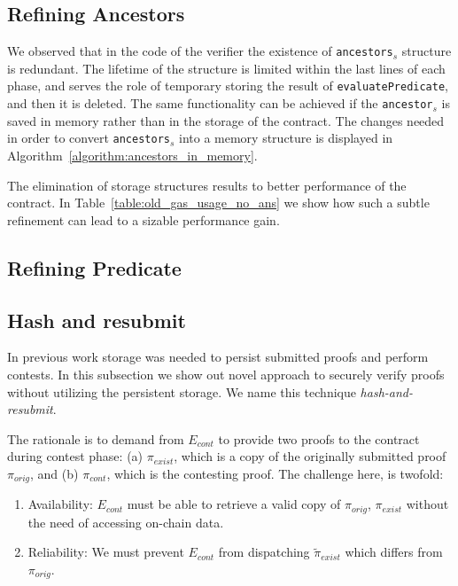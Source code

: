 

\subsection{Refining Ancestors}

We observed that in the code of the verifier the existence of
\texttt{ancestors}$_s$ structure is redundant. The lifetime of the structure is
limited within the last lines of each phase, and serves the role of temporary
storing the result of \texttt{evaluatePredicate}, and then it is deleted. The
same functionality can be achieved if the \texttt{ancestor}$_s$ is saved in
memory rather than in the storage of the contract. The changes needed in order
to convert \texttt{ancestors}$_s$ into a memory structure is displayed in
Algorithm~\ref{algorithm:ancestors_in_memory}.



The elimination of storage structures results to better performance of the
contract. In Table~\ref{table:old_gas_usage_no_ans} we show how such a subtle
refinement can lead to a sizable performance gain.



\subsection{Refining Predicate}


\subsection{Hash and resubmit}

In previous work storage was needed to persist submitted proofs and perform
contests. In this subsection we show out novel approach to securely verify
proofs without utilizing the persistent storage. We name this technique
\emph{hash-and-resubmit}.

The rationale is to demand from $E_{cont}$ to provide two proofs to the
contract during contest phase: (a) $\pi_{exist}$, which is a copy of the
originally submitted proof $\pi_{orig}$, and (b) $\pi_{cont}$, which is the
contesting proof. The challenge here, is twofold:

\begin{enumerate}

    \item Availability: $E_{cont}$ must be able to retrieve a valid copy of $\pi_{orig}$,
        $\pi_{exist}$ without the need of accessing on-chain data.

    \item Reliability: We must prevent $E_{cont}$ from dispatching
        $\tilde\pi_{exist}$ which differs from $\pi_{orig}$.

\end{enumerate}

